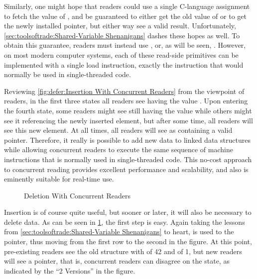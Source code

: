 Similarly, one might hope that readers could use a single C-language
assignment to fetch the value of , and be guaranteed to either
get the old value of  or to get the newly installed pointer,
but either way see a valid result.
Unfortunately, \cref{sec:toolsoftrade:Shared-Variable Shenanigans}
dashes these hopes as well.
To obtain this guarantee, readers must instead use ,
or, as will be seen, .
However, on most modern computer systems, each of these read-side primitives
can be implemented with a single load instruction, exactly the instruction
that would normally be used in single-threaded code.

Reviewing \cref{fig:defer:Insertion With Concurrent Readers}
from the viewpoint of readers, in the first three states all readers
see  having the value .
Upon entering the fourth state, some readers might see  still
having the value  while others might see it referencing the
newly inserted element, but after some time, all readers will see this
new element.
At all times, all readers will see  as containing a valid pointer.
Therefore, it really is possible to add new data to linked data structures
while allowing concurrent readers to execute the same sequence of machine
instructions that is normally used in single-threaded code.
This no-cost approach to concurrent reading provides excellent performance
and scalability, and also is eminently suitable for real-time use.

\begin{figure}
\centering
{}
\caption{Deletion With Concurrent Readers}
\label{fig:defer:Deletion With Concurrent Readers}
\end{figure}

Insertion is of course quite useful, but sooner or later, it will also
be necessary to delete data.
As can be seen in
\cref{fig:defer:Deletion With Concurrent Readers},
the first step is easy.
Again taking the lessons from
\cref{sec:toolsoftrade:Shared-Variable Shenanigans}
to heart,  is used to  the pointer,
thus moving from the first row to the second in the figure.
At this point, pre-existing readers see the old structure with
 of 42 and  of 1, but new readers will see
a  pointer, that is, concurrent readers can disagree on
the state, as indicated by the ``2 Versions'' in the figure.

